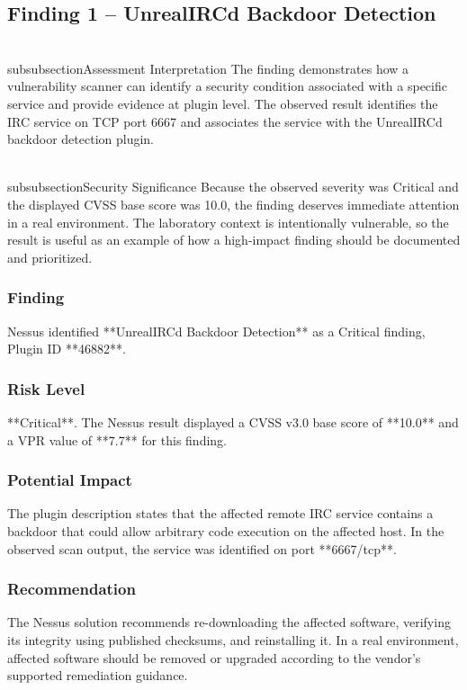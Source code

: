 \documentclass[11pt,a4paper]{article}
\begin{document}
\subsection{Finding 1 – UnrealIRCd Backdoor Detection}
\\subsubsection{Assessment Interpretation}
The finding demonstrates how a vulnerability scanner can identify a security condition associated with a specific service and provide evidence at plugin level. The observed result identifies the IRC service on TCP port 6667 and associates the service with the UnrealIRCd backdoor detection plugin.

\\subsubsection{Security Significance}
Because the observed severity was Critical and the displayed CVSS base score was 10.0, the finding deserves immediate attention in a real environment. The laboratory context is intentionally vulnerable, so the result is useful as an example of how a high-impact finding should be documented and prioritized.

\subsubsection{Finding}
Nessus identified **UnrealIRCd Backdoor Detection** as a Critical finding, Plugin ID **46882**.

\subsubsection{Risk Level}
**Critical**. The Nessus result displayed a CVSS v3.0 base score of **10.0** and a VPR value of **7.7** for this finding.

\subsubsection{Potential Impact}
The plugin description states that the affected remote IRC service contains a backdoor that could allow arbitrary code execution on the affected host. In the observed scan output, the service was identified on port **6667/tcp**.

\subsubsection{Recommendation}
The Nessus solution recommends re-downloading the affected software, verifying its integrity using published checksums, and reinstalling it. In a real environment, affected software should be removed or upgraded according to the vendor's supported remediation guidance.
\end{document}
